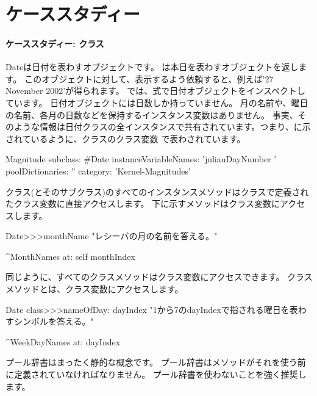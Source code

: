 \documentclass[a4paper,10pt,twoside]{book}
\begin{document}
	\renewcommand{\nnbb}[2]{} %
	\sloppy
\fi


\chapter{ケーススタディー}

\subsubsection{ケーススタディー: クラス}
Dateは日付を表わすオブジェクトです。
は本日を表わすオブジェクトを返します。
このオブジェクトに対して、表示するよう依頼すると、例えば'27 November 2002'が得られます。%
では、式で日付オブジェクトをインスペクトしています。
日付オブジェクトには日数しか持っていません。
月の名前や、曜日の名前、各月の日数などを保持するインスタンス変数はありません。
事実、そのような情報は日付クラスの全インスタンスで共有されています。つまり、に示されているように、クラスのクラス変数 %
で表わされています。

\begin{classdef}{}
Magnitude subclass: \#Date
   instanceVariableNames: 'julianDayNumber '
   poolDictionaries: ''
   category: 'Kernel-Magnitudes'
\end{classdef}


クラス(とそのサブクラス)のすべてのインスタンスメソッドはクラスで定義されたクラス変数に直接アクセスします。
下に示すメソッドはクラス変数にアクセスします。

\begin{method}{}
Date>>>monthName
   "レシーバの月の名前を答える。"

   ^MonthNames at: self monthIndex
\end{method}

同じように、すべてのクラスメソッドはクラス変数にアクセスできます。
クラスメソッドとは、クラス変数にアクセスします。

\begin{method}{}
Date class>>>nameOfDay: dayIndex 
   "1から7のdayIndexで指される曜日を表わすシンボルを答える。"

   ^WeekDayNames at: dayIndex
\end{method}


プール辞書はまったく静的な概念です。 %
プール辞書はメソッドがそれを使う前に定義されていなければなりません。%
プール辞書を使わないことを強く推奨します。%

\ifx\wholebook\relax\else
\end{document}
